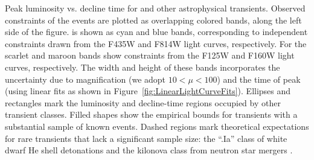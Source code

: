\label{fig:PeakLuminosityDeclineTimeWide}
Peak luminosity vs. decline time for \spock and other astrophysical
transients.  Observed constraints of the \spock events are plotted as
overlapping colored bands, along the left side of the
figure.  \spockone is shown as cyan and blue bands, corresponding to
independent constraints drawn from the F435W and F814W light curves,
respectively.  For \spocktwo the scarlet and maroon bands show
constraints from the F125W and F160W light curves, respectively.  The
width and height of these bands incorporates the uncertainty due to
magnification (we adopt $10<\mu<100$) and the time of peak (using
linear fits as shown in Figure~\ref{fig:LinearLightCurveFits}).
Ellipses and rectangles mark the luminosity and decline-time regions
occupied by other transient classes.  Filled shapes show the empirical
bounds for transients with a substantial sample of known
events. Dashed regions mark theoretical expectations for rare
transients that lack a significant sample size: the ``.Ia'' class of
white dwarf He shell detonations \citep{Bildsten:2007,Shen:2010} and
the kilonova class from neutron star
mergers \citep{Li:1998,Kulkarni:2005,Kasen:2015}.
